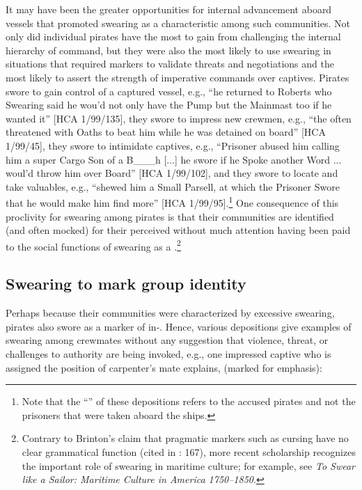 It may have been the greater opportunities for internal advancement aboard  vessels that promoted swearing as a characteristic  among such communities. Not only did individual pirates have the most to gain from challenging the internal hierarchy of command, but they were also the most likely to use swearing in situations that required  markers to validate threats and negotiations and the most likely to assert the strength of imperative commands over captives. Pirates swore to gain control of a captured vessel, e.g., “he returned to Roberts who Swearing said he wou’d not only have the Pump but the Mainmast too if he wanted it” [HCA 1/99/135], they swore to impress new crewmen, e.g., “the  often threatened with Oaths to beat him while he was detained on board” [HCA 1/99/45], they swore to intimidate captives, e.g., “Prisoner abused him calling him a super Cargo Son of a B\_\_\_h [...] he swore if he Spoke another Word ... woul’d throw him over Board” [HCA 1/99/102], and they swore to locate and take valuables, e.g., “shewed him a Small Parsell, at which the Prisoner Swore that he would make him find more” [HCA 1/99/95].\footnote{Note that the “” of these depositions refers to the accused pirates and not the prisoners that were taken aboard the  ships.}  One consequence of this proclivity for swearing among pirates is that their communities are identified (and often mocked) for their perceived  without much attention having been paid to the social functions of swearing as a .\footnote{Contrary to Brinton’s claim that pragmatic markers such as cursing have no clear grammatical function (cited in \citealt{ClaridgeArnovick2010}: 167), more recent scholarship recognizes the important role of swearing in maritime culture; for example, see  \textit{To Swear like a Sailor: Maritime Culture in America {1750}–1850}.} 

\subsection{{Swearing to mark group identity}}%

Perhaps because their communities were characterized by excessive swearing, pirates also swore as a marker of in-. Hence, various depositions give examples of swearing among crewmates without any suggestion that violence, threat, or challenges to authority are being invoked, e.g., one impressed captive who is assigned the position of carpenter’s mate explains, (marked for emphasis): 

